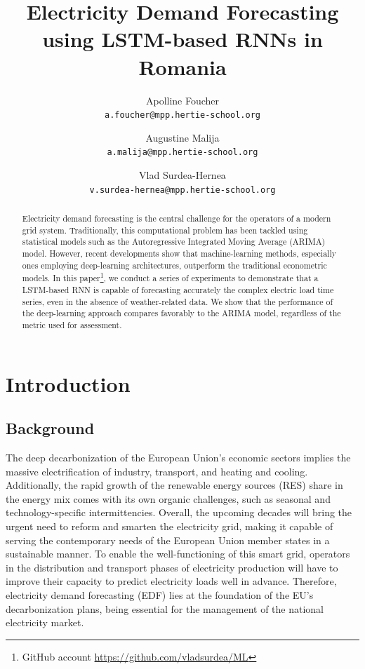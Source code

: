 \documentclass[10pt,twocolumn,letterpaper]{article}
\begin{document}
\title{Electricity Demand Forecasting using  LSTM-based RNNs in Romania}


\author{Apolline Foucher\\
{\tt\small a.foucher@mpp.hertie-school.org}
\and
Augustine Malija\\
{\tt\small a.malija@mpp.hertie-school.org}
\and
Vlad Surdea-Hernea\\
{\tt\small v.surdea-hernea@mpp.hertie-school.org}
}


\maketitle





\begin{abstract}
 Electricity demand forecasting is the central challenge for the operators of a modern grid system. Traditionally, this computational problem has been tackled using statistical models such as the Autoregressive Integrated Moving Average (ARIMA)  model. However, recent developments show that machine-learning methods, especially ones employing deep-learning architectures, outperform the traditional econometric models. In this paper\footnote{GitHub account \url{https://github.com/vladsurdea/ML}}, we conduct a series of experiments to demonstrate that a LSTM-based RNN is capable of forecasting accurately the complex electric load time series, even in the absence of weather-related data. We show that the performance of the deep-learning approach compares favorably to the ARIMA model, regardless of the metric used for assessment. 
\end{abstract}


\section{Introduction}

\subsection{Background}
The deep decarbonization of the European Union’s economic sectors implies the massive electrification of industry, transport, and heating and cooling. Additionally, the rapid growth of the renewable energy sources (RES) share in the energy mix comes with its own organic challenges, such as seasonal and technology-specific intermittencies.  Overall, the upcoming decades will bring the urgent need to reform and smarten the electricity grid, making it capable of serving the contemporary needs of the European Union member states in a sustainable manner. To enable the well-functioning of this smart grid, operators in the distribution and transport phases of electricity production will have to improve their capacity to predict electricity loads well in advance. Therefore, electricity demand forecasting (EDF) lies at the foundation of the EU’s decarbonization plans, being essential for the management of the national electricity market. 
\end{document}
